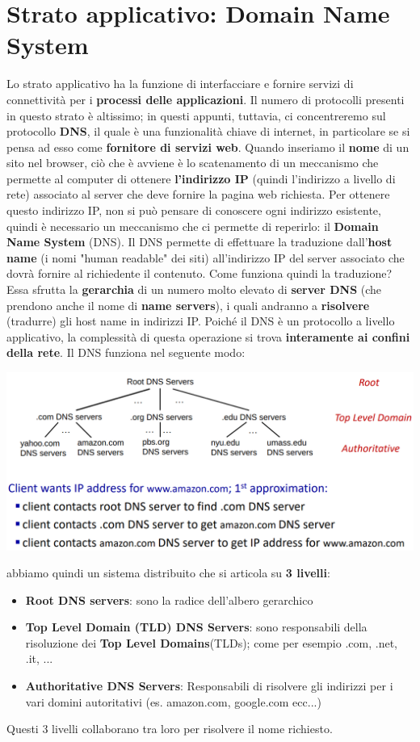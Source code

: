 \documentclass[12pt]{article}
\begin{document}
\section{Strato applicativo: Domain Name System}
Lo strato applicativo ha la funzione di interfacciare e fornire servizi di connettività per i \textbf{processi delle applicazioni}. Il numero
di protocolli presenti in questo strato è altissimo; in questi appunti, tuttavia, ci concentreremo sul protocollo \textbf{DNS}, il quale è una funzionalità chiave di internet, in particolare
se si pensa ad esso come \textbf{fornitore di servizi web}. Quando inseriamo il \textbf{nome} di un sito nel browser, ciò che è avviene è lo scatenamento di un meccanismo che permette al computer
di ottenere \textbf{l'indirizzo IP} (quindi l'indirizzo a livello di rete) associato al server che deve fornire la pagina web richiesta. Per ottenere questo indirizzo IP, non si può pensare di conoscere
ogni indirizzo esistente, quindi è necessario un meccanismo che ci permette di reperirlo: il \textbf{Domain Name System} (DNS). Il DNS permette di effettuare la traduzione dall'\textbf{host name} (i nomi "human readable" dei siti)
all'indirizzo IP del server associato che dovrà fornire al richiedente il contenuto. Come funziona quindi la traduzione? Essa sfrutta la \textbf{gerarchia} di un numero molto elevato di \textbf{server DNS} (che prendono anche il nome di \textbf{name servers}),
i quali andranno a \textbf{risolvere} (tradurre) gli host name in indirizzi IP. Poiché il DNS è un protocollo a livello applicativo, la complessità di questa operazione si trova \textbf{interamente ai confini della rete}.
Il DNS funziona nel seguente modo:
\begin{center}
    \includegraphics[width = 0.90\linewidth]{Images/32.png}
\end{center}
abbiamo quindi un sistema distribuito che si articola su \textbf{3 livelli}:
\begin{itemize}
    \item \textbf{Root DNS servers}: sono la radice dell'albero gerarchico
    \item \textbf{Top Level Domain (TLD) DNS Servers}: sono responsabili della risoluzione dei \textbf{Top Level Domains}(TLDs); come per esempio .com, .net, .it, ...
    \item \textbf{Authoritative DNS Servers}: Responsabili di risolvere gli indirizzi per i vari domini autoritativi (es. amazon.com, google.com ecc...)
\end{itemize}
Questi 3 livelli collaborano tra loro per risolvere il nome richiesto.
\end{document}
